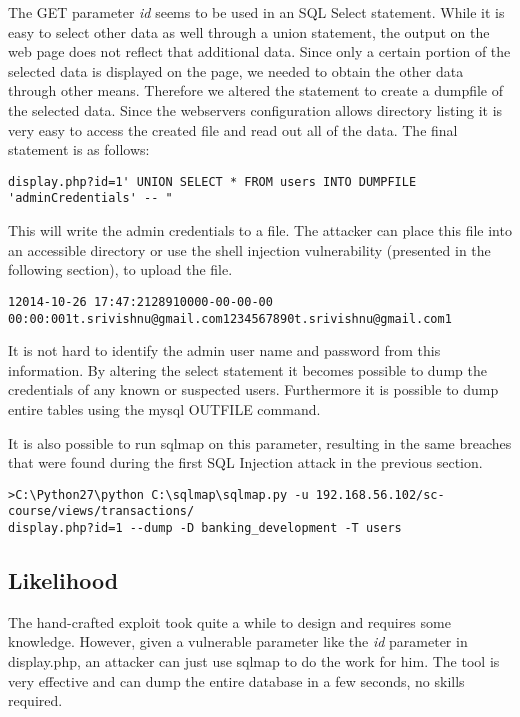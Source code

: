 The GET parameter \emph{id} seems to be used in an SQL Select statement. While it is easy to select other data as well through a union statement, the output on the web page does not reflect that additional data. Since only a certain portion of the selected data is displayed on the page, we needed to obtain the other data through other means. Therefore we altered the statement to create a dumpfile of the selected data. Since the webservers configuration allows directory listing it is very easy to access the created file and read out all of the data. The final statement is as follows:

\begin{lstlisting}[caption= Dumping admin credentials to file via Injection, label=listing:injection2statement]
display.php?id=1' UNION SELECT * FROM users INTO DUMPFILE 'adminCredentials' -- "
\end{lstlisting}

This will write the admin credentials to a file. The attacker can place this file into an accessible directory or use the shell injection vulnerability (presented in the following section), to upload the file.

\begin{lstlisting}[caption= File Contents, label=listing:injection2statement]
12014-10-26 17:47:2128910000-00-00-00 00:00:001t.srivishnu@gmail.com1234567890t.srivishnu@gmail.com1
\end{lstlisting}
It is not hard to identify the admin user name and password from this information. By altering the select statement it becomes possible to dump the credentials of any known or suspected users. Furthermore it is possible to dump entire tables using the mysql OUTFILE command.

It is also possible to run sqlmap on this parameter, resulting in the same breaches that were found during the first SQL Injection attack in the previous section.
\begin{lstlisting}[caption= Using sqlmap on id parameter in display.php, label=listing:injection2statement]
>C:\Python27\python C:\sqlmap\sqlmap.py -u 192.168.56.102/sc-course/views/transactions/
display.php?id=1 --dump -D banking_development -T users
\end{lstlisting}
\subsection{Likelihood}
The hand-crafted exploit took quite a while to design and requires some knowledge. However, given a vulnerable parameter like the \emph{id} parameter in display.php, an attacker can just use sqlmap to do the work for him. The tool is very effective and can dump the entire database in a few seconds, no skills required.

